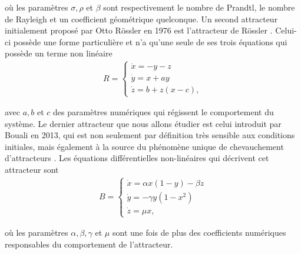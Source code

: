     où les paramètres $\sigma, \rho$ et $\beta$ sont respectivement le nombre de Prandtl, le nombre de Rayleigh et un coefficient géométrique quelconque. Un second attracteur initialement proposé par Otto Rössler en 1976 est l'attracteur de Rössler \cite{rossler}. Celui-ci possède une forme particulière et n'a qu'une seule de ses trois équations qui possède un terme non linéaire
    \begin{align}
        R = \left\{
        \begin{array}{c}
           \Dot{x} = -y - z \\
           \Dot{y} = x + ay \\
           \Dot{z} = b + z(x - c), 
        \end{array}
        \right.
        \label{eq : rossler}
    \end{align}

    avec $a, b$ et $c$ des paramètres numériques qui régissent le comportement du système. Le dernier attracteur que nous allons étudier est celui introduit par Bouali en 2013, qui est non seulement par définition très sensible aux conditions initiales, mais également à la source du phénomène unique de chevauchement d'attracteurs \cite{bouali}. Les équations différentielles non-linéaires qui décrivent cet attracteur sont
        \begin{align}
        B = \left\{
        \begin{array}{c}
           \Dot{x} = \alpha x(1 - y) - \beta z \\
           \Dot{y} = -\gamma y(1 - x^2) \\
           \Dot{z} = \mu x,
        \end{array}
        \right.
        \label{eq : bouali}
    \end{align}

    où les paramètres $\alpha, \beta, \gamma$ et $\mu$ sont une fois de plus des coefficients numériques responsables du comportement de l'attracteur.

